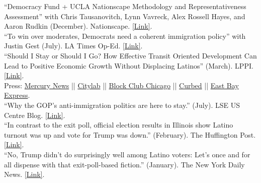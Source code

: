 \documentclass[11pt, a4paper]{article}
\newcommand{\years}[1]{\marginnote{\scriptsize #1}}
\begin{document}
\years{2019} ``Democracy Fund + UCLA
Nationscape Methodology and Representativeness Assessment'' with Chris Tausanovitch, Lynn Vavreck, Alex Rossell Hayes, and Aaron Rudkin (December). Nationscape. \href{https://www.voterstudygroup.org/download?lv=R9WVD6NcOZQVNZoKZOIRbASygr6H4fSnrLZ158RPvbx17XUGELPaq0KolDijyiTyN205aY805eFc2jdEul4iEsakXrQ50jcWVze58Hkn1FW6gSjR6OGY3IlQbtx6e%252BLQv0KjZJFudeXzYDWxzy6DuUdGxT2zwj0q8BzOOCMb3R%252Bx0Nz%252FlTNV9hE%252Fl8MgnTER0JU1SoCrk3o2mWygPDFDQBAEZixF4SmfssUk9Sl62Gd26KlJIInDvQ1j%252BAql0lUR}{[Link]}.\\
\years{2018} ``To win over moderates, Democrats need a coherent immigration policy'' with Justin Gest (July). LA Times Op-Ed. \href{http://www.latimes.com/opinion/op-ed/la-oe-gest-reny-immigration-policy-democrats-20180720-story.html}{[Link]}.\\
\years{} ``Should I Stay or Should I Go? How Effective Transit Oriented Development Can Lead to Positive Economic Growth Without Displacing Latinos'' (March). LPPI. \href{http://latino.ucla.edu/}{[Link]}.\\
\indent Press: 
\indent \href{https://www.mercurynews.com/2018/03/29/development-without-gentrification-oaklands-fruitvale-is-the-model-report-says/}{Mercury News} || 
\indent \href{https://www.citylab.com/equity/2018/04/how-transit-oriented-development-can-prevent-displacement/556373/?utm_source=twb%3Futm_source%3Dfbb}{Citylab} || \indent \href{https://blockclubchicago.org/2018/11/12/can-chicagos-gentrifying-neighborhoods-grow-without-leaving-longtime-residents-behind-oaklands-fruitvale-village-offers-hope/}{Block Club Chicago} ||
\indent \href{https://sf.curbed.com/2018/4/4/17198326/oakland-fruitvale-transit-village-housing-displacement-gentrification}{Curbed} || 
\indent \href{https://www.eastbayexpress.com/SevenDays/archives/2018/04/02/mondays-briefing-ucla-study-says-fruitvale-village-is-a-model-for-urban-planning-stephon-clark-protestor-struck-by-sacramento-sheriffs-veh}{East Bay Express}.\\
\years{} ``Why the GOP’s anti-immigration politics are here to stay.'' (July). LSE US Centre Blog. \href{http://blogs.lse.ac.uk/usappblog/2018/07/09/why-the-gops-anti-immigration-politics-are-here-to-stay/}{[Link]}.\\
\years{2017} ``In contrast to the exit poll, official election results in Illinois show Latino turnout was up and vote for Trump was down.'' (February). The Huffington Post. \href{http://huff.to/2lC9rc8}{[Link]}.\\
\years{} ``No, Trump didn't do surprisingly well among Latino voters: Let's once and for all dispense with that exit-poll-based fiction.'' (January). The New York Daily News. \href{http://nydn.us/2jtowIr}{[Link]}.\\
\end{document}
